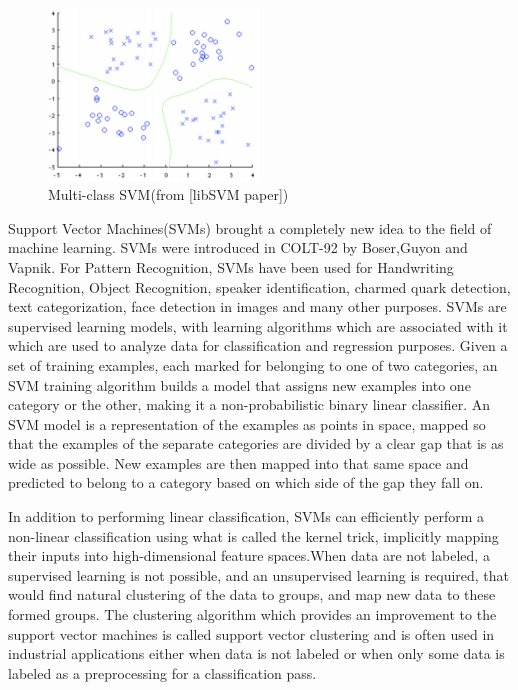 \begin{figure}[b]
	\begin{center}
		\includegraphics[width=0.5\textwidth]{Figures/Figure10}
	\end{center}
	\caption{Multi-class SVM(from [libSVM paper])}
	\label{fig:Figure10}
\end{figure}

Support Vector Machines(SVMs)\cite{vapnik} brought a completely new idea to the field of machine learning. SVMs were introduced in COLT-92 by Boser,Guyon and Vapnik. For Pattern Recognition, SVMs have been used for Handwriting Recognition, Object Recognition, speaker identification, charmed quark detection, text categorization, face detection in images and many other purposes. SVMs are supervised learning models, with learning algorithms which are associated with it which are used to analyze data for classification and regression purposes. Given a set of training examples, each marked for belonging to one of two categories, an SVM training algorithm builds a model that assigns new examples into one category or the other, making it a non-probabilistic binary linear classifier. An SVM model is a representation of the examples as points in space, mapped so that the examples of the separate categories are divided by a clear gap that is as wide as possible. New examples are then mapped into that same space and predicted to belong to a category based on which side of the gap they fall on.

In addition to performing linear classification, SVMs can efficiently perform a non-linear classification using what is called the kernel trick, implicitly mapping their inputs into high-dimensional feature spaces.When data are not labeled, a supervised learning is not possible, and an unsupervised learning is required, that would find natural clustering of the data to groups, and map new data to these formed groups. The clustering algorithm which provides an improvement to the support vector machines is called support vector clustering and is often used in industrial applications either when data is not labeled or when only some data is labeled as a preprocessing for a classification pass.

